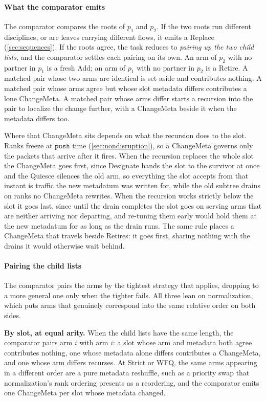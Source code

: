 \documentclass[sigplan,anonymous,review,nonacm]{acmart}
\newcommand{\push}{\ensuremath{\mathtt{push}}}
\newcommand{\Strict}{\textsf{Strict}}
\newcommand{\WFQ}{\textsf{WFQ}}
\newcommand{\Add}{\textsf{Add}}
\newcommand{\ChangeMeta}{\textsf{ChangeMeta}}
\newcommand{\Quiesce}{\textsf{Quiesce}}
\newcommand{\Designate}{\textsf{Designate}}
\newcommand{\Retire}{\textsf{Retire}}
\newcommand{\Replace}{\textsf{Replace}}
\begin{document}
\paragraph{What the comparator emits}

The comparator compares the roots of \(p_1\) and \(p_2\).
If the two roots run different disciplines, or are leaves carrying different flows, it emits a \Replace{} (\cref{sec:sequences}).
If the roots agree, the task reduces to \emph{pairing up the two child lists}, and the comparator settles each pairing on its own.
An arm of \(p_2\) with no partner in \(p_1\) is a fresh \Add{}; an arm of \(p_1\) with no partner in \(p_2\) is a \Retire{}.
A matched pair whose two arms are identical is set aside and contributes nothing.
A matched pair whose arms agree but whose slot metadata differs contributes a lone \ChangeMeta{}.
A matched pair whose arms differ starts a recursion into the pair to localize the change further, with a \ChangeMeta{} beside it when the metadata differs too.

Where that \ChangeMeta{} sits depends on what the recursion does to the slot.
Ranks freeze at \push{} time (\cref{sec:nondisruption}), so a \ChangeMeta{} governs only the packets that arrive after it fires.
When the recursion replaces the whole slot the \ChangeMeta{} goes first, since \Designate{} hands the slot to the survivor at once and the \Quiesce{} silences the old arm, so everything the slot accepts from that instant is traffic the new metadatum was written for, while the old subtree drains on ranks no \ChangeMeta{} rewrites.
When the recursion works strictly below the slot it goes last, since until the drain completes the slot goes on serving arms that are neither arriving nor departing, and re-tuning them early would hold them at the new metadatum for as long as the drain runs.
The same rule places a \ChangeMeta{} that travels beside \Retire{}s: it goes first, sharing nothing with the drains it would otherwise wait behind.

\paragraph{Pairing the child lists}

The comparator pairs the arms by the tightest strategy that applies, dropping to a more general one only when the tighter fails.
All three lean on normalization, which puts arms that genuinely correspond into the same relative order on both sides.

\textbf{By slot, at equal arity.}
When the child lists have the same length, the comparator pairs arm \(i\) with arm \(i\): a slot whose arm and metadata both agree contributes nothing, one whose metadata alone differs contributes a \ChangeMeta{}, and one whose arm differs recurses.
At \Strict{} or \WFQ{}, the same arms appearing in a different order are a pure metadata reshuffle, such as a priority swap that normalization's rank ordering presents as a reordering, and the comparator emits one \ChangeMeta{} per slot whose metadata changed.
\end{document}
